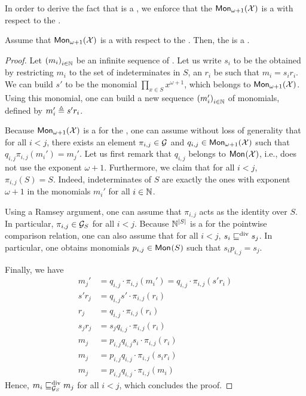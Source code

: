 In order to derive the fact that  is a
, we enforce that the $\mon[\omega+1]{\X}$ is a
 with respect to the .

\begin{lemma}
    \label{def:wqo-g-implies-g-s}
    Assume that $\mon[\omega+1]{\X}$ is a  with respect to
    the . Then, the  is a .
\end{lemma}
\begin{proof}

    Let $\seqof{m_i}[i \in \N]$ be an infinite sequence of . Let
    us write $s_i$ to be the  obtained by restricting $m_i$ to the
    set of indeterminates in $S$, an $r_i$ be such that $m_i = s_i r_i$. We can
    build $s'$ to be the monomial $\prod_{x \in S} x^{\omega+1}$, which belongs
    to $\mon[\omega+1]{\X}$. Using this monomial, one can build a new sequence
    $\seqof{m_i'}[i \in \N]$ of monomials, defined by $m_i' \defined s' r_i$.

    Because $\mon[\omega+1]{\X}$ is a  for the
    , one can assume without loss of generality
    that for all $i < j$, there exists an element $\pi_{i,j} \in \group$ and
    $q_{i,j} \in \mon[\omega+1]{\X}$ such that $q_{i,j} \pi_{i,j}(m_i') =
    m_j'$. Let us first remark that $q_{i,j}$ belongs to $\mon{\X}$, i.e., does
    not use the exponent $\omega+1$. Furthermore, we claim that for all $i <
    j$, $\pi_{i,j}(S) = S$. Indeed, indeterminates of $S$ are exactly the ones
    with exponent $\omega+1$ in the monomials $m_i'$ for all $i \in \N$.

    Using a Ramsey argument, one can assume that $\pi_{i,j}$ acts as the
    identity over $S$. In particular, $\pi_{i,j} \in \group_S$ for all $i < j$.
    Because $\N^{|S|}$ is a  for the pointwise
    comparison relation, one can also assume that for all $i < j$, $s_i \divleq
    s_j$. In particular, one obtains monomials $p_{i,j} \in \mon{S}$ such that
    $s_i p_{i,j} = s_j$.

    Finally, we have 
    \begin{align*}
        m_j'      &= q_{i,j} \cdot \pi_{i,j}(m_i')
                  = q_{i,j} \cdot \pi_{i,j}(s' r_i) \\
        s' r_j    &= q_{i,j} s' \cdot \pi_{i,j}(r_i) \\
        r_j    &= q_{i,j} \cdot \pi_{i,j}(r_i) \\
        s_j r_j    &= s_j q_{i,j} \cdot \pi_{i,j}(r_i) \\
        m_j    &= p_{i,j} q_{i,j} s_i \cdot \pi_{i,j}(r_i) \\
        m_j    &= p_{i,j} q_{i,j} \cdot \pi_{i,j}(s_i r_i) \\
        m_j    &= p_{i,j} q_{i,j} \cdot \pi_{i,j}(m_i) 
    \end{align*}
    Hence, $m_i \gdivleq[\group_S] m_j$ for all $i < j$, which concludes the proof.
\end{proof}

